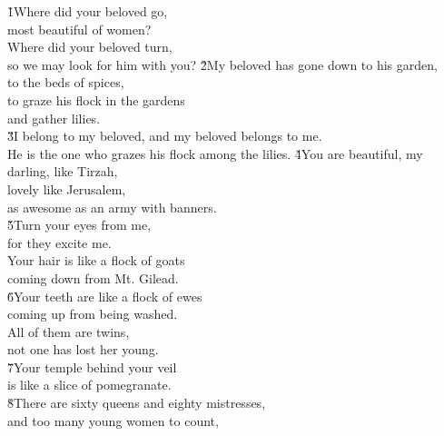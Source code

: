 \begin{poetry}
\poeml {}
\v{1}Where did your beloved go, \\
\poeml most beautiful of women? \\
\poeml Where did your beloved turn, \\
\poeml so we may look for him with you?
\poeml \v{2}My beloved has gone down to his garden, \\
\poemll    to the beds of spices, \\
\poeml to graze his flock in the gardens \\
\poemll    and gather lilies. \\
\poeml \v{3}I belong to my beloved, and my beloved belongs to me. \\
\poemll    He is the one who grazes his flock among the lilies.
\poeml \v{4}You are beautiful, my darling, like Tirzah, \\
\poemll    lovely like Jerusalem, \\
\poemlll       as awesome as an army with banners. \\
\poeml \v{5}Turn your eyes from me, \\
\poemll    for they excite me. \\
\poeml Your hair is like a flock of goats \\
\poemll    coming down from Mt. Gilead. \\
\poeml \v{6}Your teeth are like a flock of ewes \\
\poemll    coming up from being washed. \\
\poeml All of them are twins, \\
\poemll    not one has lost her young. \\
\poeml \v{7}Your temple behind your veil \\
\poemll    is like a slice of pomegranate. \\
\poeml \v{8}There are sixty queens and eighty mistresses, \\
\poemll    and too many young women to count, \\

\end{poetry}

